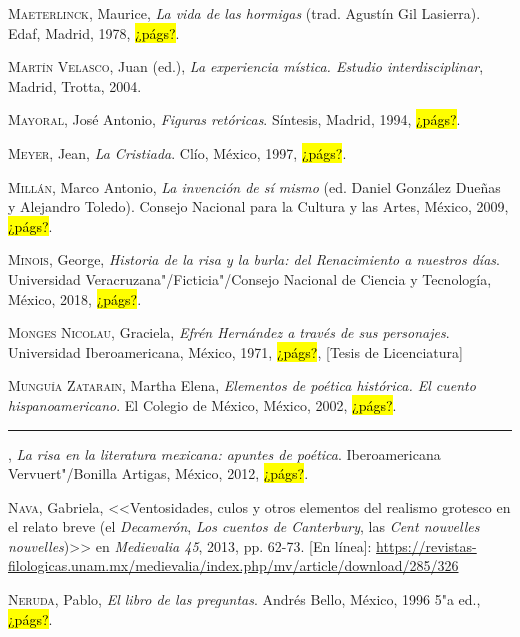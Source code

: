 \documentclass[14pt,twoside,final]{extbook} %
\begin{document}
\textsc{Maeterlinck}, Maurice, \emph{La vida de las hormigas} (trad. Agustín Gil Lasierra). Edaf, Madrid, 1978, \hl{¿págs?}.\label{bib:maeterlinck1978}

\textsc{Martín Velasco}, Juan (ed.), \emph{La experiencia mística. Estudio interdisciplinar}, Madrid, Trotta, 2004.\label{bib:martin2004}

\textsc{Mayoral}, José Antonio, \emph{Figuras retóricas}. Síntesis, Madrid, 1994, \hl{¿págs?}.\label{bib:mayoral1994}

\textsc{Meyer}, Jean, \emph{La Cristiada}. Clío, México, 1997,  \hl{¿págs?}.\label{bib:meyer1997}

\textsc{Millán}, Marco Antonio, \emph{La invención de sí mismo} (ed. Daniel González Dueñas y Alejandro Toledo). Consejo Nacional para la Cultura y las Artes, México, 2009, \hl{¿págs?}.\label{bib:millan2009}

\textsc{Minois}, George, \emph{Historia de la risa y la burla: del Renacimiento a nuestros días}. Universidad Veracruzana"/Ficticia"/Consejo Nacional de Ciencia y Tecnología, México, 2018, \hl{¿págs?}.\label{bib:minois2018}

\textsc{Monges Nicolau}, Graciela, \emph{Efrén Hernández a través de sus personajes}. Universidad Iberoamericana, México, 1971, \hl{¿págs?}, [Tesis de Licenciatura]\label{bib:monges1971}

\textsc{Munguía Zatarain}, Martha Elena, \emph{Elementos de poética histórica. El cuento hispanoamericano}. El Colegio de México, México, 2002, \hl{¿págs?}.\label{bib:munguia2002}

\rule{1cm}{0.4pt}, \emph{La risa en la literatura mexicana: apuntes de poética}. Iberoamericana Vervuert"/Bonilla Artigas, México, 2012, \hl{¿págs?}.\label{bib:munguia2012}

\textsc{Nava}, Gabriela, <<Ventosidades, culos y otros elementos del realismo grotesco en el relato breve (el \emph{Decamerón}, \emph{Los cuentos de Canterbury}, las \emph{Cent nouvelles nouvelles})>> en \emph{Medievalia 45}, 2013, pp. 62-73. [En línea]: \url{https://revistas-filologicas.unam.mx/medievalia/index.php/mv/article/download/285/326}\label{bib:nava2013}

\textsc{Neruda}, Pablo, \emph{El libro de las preguntas}. Andrés Bello, México, 1996 5"a ed., \hl{¿págs?}.\label{bib:neruda1996}
\end{document}
